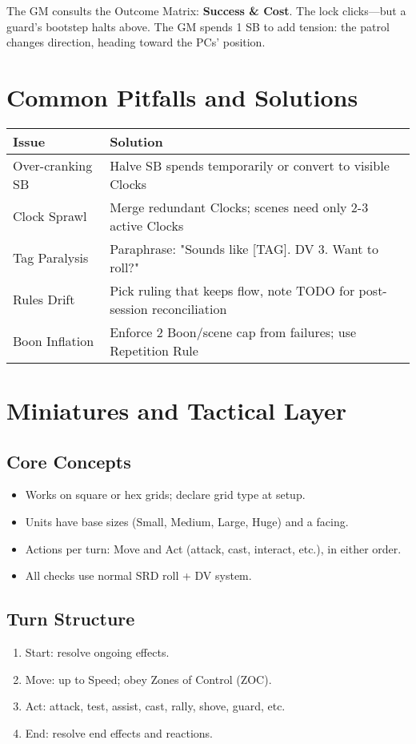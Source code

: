 The GM consults the Outcome Matrix: \textbf{Success \& Cost}. The lock clicks---but a guard's bootstep halts above. The GM spends 1 SB to add tension: the patrol changes direction, heading toward the PCs' position.

\section{Common Pitfalls and Solutions}

\begin{fatebox}
\begin{tabularx}{\textwidth}{lX}
\toprule
\textbf{Issue} & \textbf{Solution} \\
\midrule
Over-cranking SB & Halve SB spends temporarily or convert to visible Clocks \\
Clock Sprawl & Merge redundant Clocks; scenes need only 2-3 active Clocks \\
Tag Paralysis & Paraphrase: "Sounds like [TAG]. DV 3. Want to roll?" \\
Rules Drift & Pick ruling that keeps flow, note TODO for post-session reconciliation \\
Boon Inflation & Enforce 2 Boon/scene cap from failures; use Repetition Rule \\
\bottomrule
\end{tabularx}
\end{fatebox}

\section{Miniatures and Tactical Layer}
\label{sec:miniatures}

\subsection{Core Concepts}
\begin{itemize}
  \item Works on square or hex grids; declare grid type at setup.
  \item Units have base sizes (Small, Medium, Large, Huge) and a facing.
  \item Actions per turn: Move and Act (attack, cast, interact, etc.), in either order.
  \item All checks use normal SRD roll + DV system.
\end{itemize}

\subsection{Turn Structure}
\begin{enumerate}
  \item Start: resolve ongoing effects.
  \item Move: up to Speed; obey Zones of Control (ZOC).
  \item Act: attack, test, assist, cast, rally, shove, guard, etc.
  \item End: resolve end effects and reactions.
\end{enumerate}

